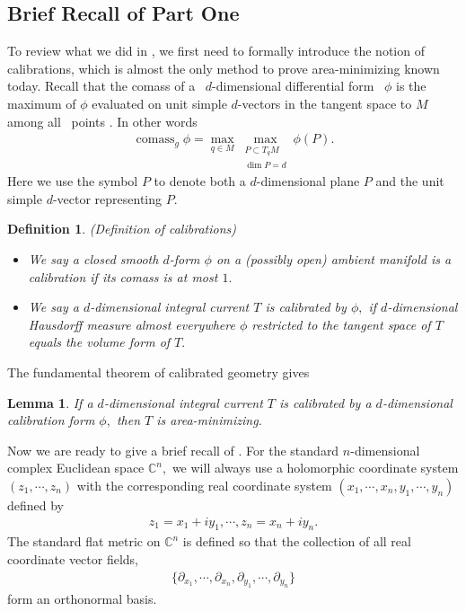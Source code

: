 \documentclass[11pt,a4paper]{amsart}
\numberwithin{equation}{section}
\newcommand{\cms}{\operatorname{comass}}
\newcommand{\cd}{\cdots}
\newcommand{\s}{\subset}
\newcommand{\pd}{\partial}
\newcommand{\C}{\mathbb{C}}
\theoremstyle{plain}
\newtheorem{lem}[exam]{Lemma}
\newtheorem{defn}[exam]{Definition}
\theoremstyle{definition}
\numberwithin{equation}{subsection}
\begin{document}
	\subsection{Brief Recall of Part One}\label{secbf}
	To review what we did in \cite{ZLa}, we first need to formally introduce the notion of calibrations, which is almost the only method to prove area-minimizing \cite{HL} known today. Recall that the comass of a  $d$-dimensional differential form  $\phi$ is the maximum of $\phi$ evaluated on unit simple $d$-vectors in the tangent space to $M$ among all  points \cite[Section 1.8]{HF}. In other words
	\begin{align}\label{eqcms}
		\cms_g\phi=\max_{q\in M}\max_{\substack{P\s T_qM\\ \dim P=d}}\phi(P).
	\end{align}
	Here we use the symbol $P$ to denote both a $d$-dimensional plane $P$ and the unit simple $d$-vector representing $P.$
	\begin{defn}(Definition of calibrations)\label{defncal}
		\begin{itemize}
			\item 	We say a closed smooth $d$-form $\phi$ on a (possibly open) ambient manifold is a calibration if its comass is at most $1.$ 
			\item 
			We say a $d$-dimensional integral current $T$ is calibrated by $\phi,$ if $d$-dimensional Hausdorff measure almost everywhere $\phi$ restricted to the tangent space of $T$ equals the volume form of $T.$
		\end{itemize}
	\end{defn}
	The fundamental theorem of calibrated geometry \cite[Theorem 4.2]{HL} gives	\begin{lem}\label{fcal}
		If a $d$-dimensional integral current $T$ is calibrated by a $d$-dimensional calibration form $\phi,$ then $T$ is area-minimizing.
	\end{lem}
	
	Now we are ready to give a brief recall of \cite{ZLa}. For the standard $n$-dimensional complex Euclidean space $\C^n,$ we will always use a holomorphic coordinate system $(z_1,\cd,z_n)$ with the corresponding real coordinate system $(x_1,\cd,x_n,y_1,\cd,y_n)$ defined by 
	\begin{align}\label{cscz}
		z_1=x_1+iy_1,\cd,z_n=x_n+iy_n.
	\end{align} The standard flat metric on $\C^n$ is defined so that the collection of all real coordinate vector fields,  \begin{align}\label{bsxy}
		\{\pd_{x_1},\cd,\pd_{x_n},\pd_{y_1},\cd,\pd_{y_n}\}
	\end{align}
	form an orthonormal basis.
	
\end{document}
